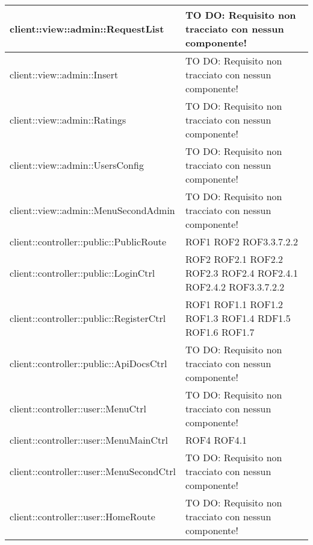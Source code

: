 \begin{center}
\begin{longtable}{| p{11cm} | p{2.5cm} |}
client::view::admin::RequestList & TO DO: Requisito non tracciato con nessun componente! \\
\hline
client::view::admin::Insert & TO DO: Requisito non tracciato con nessun componente! \\
\hline
client::view::admin::Ratings & TO DO: Requisito non tracciato con nessun componente! \\
\hline
client::view::admin::UsersConfig & TO DO: Requisito non tracciato con nessun componente! \\
\hline
client::view::admin::MenuSecondAdmin & TO DO: Requisito non tracciato con nessun componente! \\
\hline
client::controller::public::PublicRoute & ROF1 \newline ROF2 \newline ROF3.3.7.2.2 \\
\hline
client::controller::public::LoginCtrl & ROF2 \newline ROF2.1 \newline ROF2.2 \newline ROF2.3 \newline ROF2.4 \newline ROF2.4.1 \newline ROF2.4.2 \newline ROF3.3.7.2.2 \\
\hline
client::controller::public::RegisterCtrl & ROF1 \newline ROF1.1 \newline ROF1.2 \newline ROF1.3 \newline ROF1.4 \newline RDF1.5 \newline ROF1.6 \newline ROF1.7 \\
\hline
client::controller::public::ApiDocsCtrl & TO DO: Requisito non tracciato con nessun componente! \\
\hline
client::controller::user::MenuCtrl & TO DO: Requisito non tracciato con nessun componente! \\
\hline
client::controller::user::MenuMainCtrl & ROF4 \newline ROF4.1 \\
\hline
client::controller::user::MenuSecondCtrl & TO DO: Requisito non tracciato con nessun componente! \\
\hline
client::controller::user::HomeRoute & TO DO: Requisito non tracciato con nessun componente! \\

\end{longtable}
\end{center}
